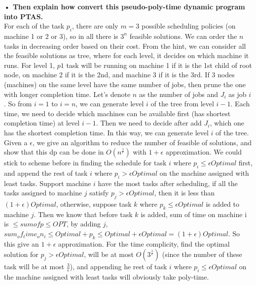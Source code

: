 \documentclass{article}
\begin{document}
\textbf{• Then explain how convert this pseudo-poly-time dynamic program into PTAS.}\\ \newline
For each of the task $p_i$, there are only $m = 3$ possible scheduling policies (on machine 1 or 2 or 3), so in all there is $3^n$ feasible solutions. We can order the $n$ tasks in decreasing order based on their cost. From the hint, we can consider all the feasible solutions as tree, where for each level, it decides on which machine it runs. For level 1, $p1$ task will be running on machine 1 if it is the 1st child of root node, on machine 2 if it is the 2nd, and machine 3 if it is the 3rd. If 3 nodes (machines) on the same level have the same number of jobs, then prune the one with longer completion time. Let's denote $n$ as the number of jobs and $J_i$ as job $i$. So from $i = 1$ to $i = n$, we can generate level $i$ of the tree from level $i - 1$. Each time, we need to decide which machines can be available first (has shortest completion time) at level $i-1$. Then we need to decide after add $J_i$, which one has the shortest completion time. In this way, we can generate level $i$ of the tree.  
\\ \newline
Given a $\epsilon$, we give an algorithm to reduce the number of feasible of solutions, and show that this dp can be done in $O(n^{\frac{1}{\epsilon}})$ with $1+\epsilon$ approximation. We could stick to scheme before in finding the schedule for task $i$ where $p_i \leq \epsilon Optimal$ first, and append the rest of task $i$ where $p_i > \epsilon Optimal$ on the machine assigned with least tasks. Support machine $i$ have the most tasks after scheduling, if all the tasks assigned to machine $j$ satisfy $p_j > \epsilon Optimal$, then it is less than $(1+\epsilon)Optimal$, otherwise, suppose task $k$ where $p_k \leq \epsilon Optimal$ is added to machine $j$. Then we know that before task $k$ is added, sum of time on machine i is $\leq sum of p \leq OPT$, by adding $j$, $sum_of_time_on_i \leq Optimal + p_k  \leq Optimal + \epsilon Optimal = (1+\epsilon)Optimal$. So this give an $1+\epsilon$ approximation. For the time complicity, find the optimal solution for $p_j > \epsilon Optimal$, will be at most $O(3^\frac{1}{\epsilon})$ (since the number of these task will be at most $\frac{3}{\epsilon}$), and appending  he rest of task $i$ where $p_i \leq \epsilon Optimal$ on the machine assigned with least tasks will obviously take poly-time.
\end{document}
